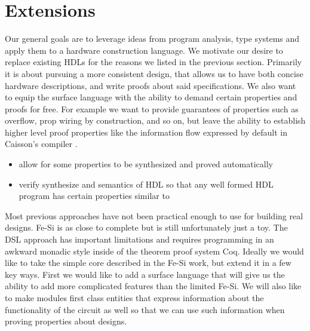 \documentclass[12pt, titlepage]{article}
\begin{document}
\section{Extensions}

Our general goals are to leverage ideas from program analysis, type systems and
apply them to a hardware construction language. We motivate our desire to replace existing HDLs for the
reasons we listed in the previous section. Primarily it is about pursuing a more consistent design, that
allows us to have both concise hardware descriptions, and write proofs about said specifications. We
also want to equip the surface language with the ability to demand certain properties and proofs for
free. For example we want to provide guarantees of properties such as overflow, prop wiring by construction,
and so on, but leave the ability to establish higher level proof properties like the information
flow expressed by default in Caisson's compiler \cite{Li:2011:CHD:1993498.1993512}.

\begin{itemize}
    \item allow for some properties to be synthesized and proved automatically
    \item verify synthesize and semantics of HDL so that any well formed HDL program has certain properties similar to \cite{Ricketts:2014}
\end{itemize}

Most previous approaches have not been practical enough to use for building real designs. Fe-Si is as close to
complete but is still unfortunately just a toy. The DSL approach has important limitations and requires
programming in an awkward monadic style inside of the theorem proof system Coq. Ideally we would like to take the 
simple core described in the Fe-Si work, but extend it in a few key ways. First we would like to add a surface language
that will give us the ability to add more complicated features than the limited Fe-Si. We will also like to make modules first class
entities that express information about the functionality of the circuit as well so that we can use such information when proving
properties about designs.
\end{document}
